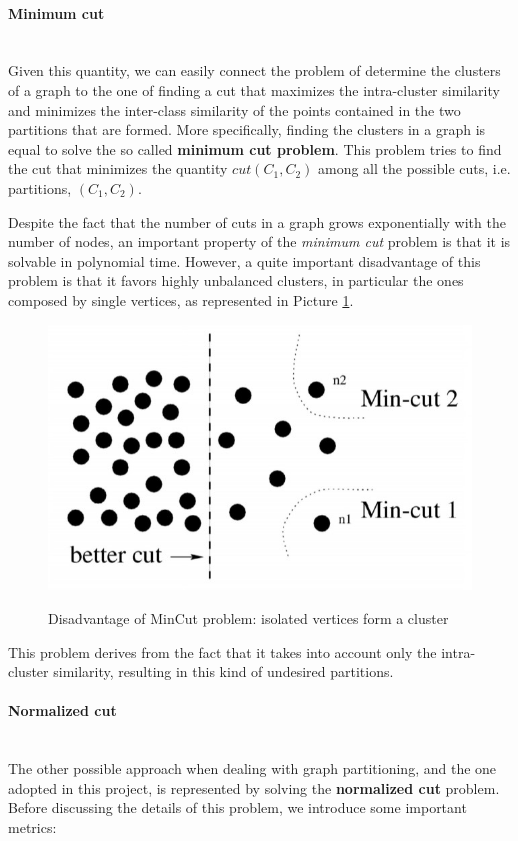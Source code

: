 \paragraph{Minimum cut}
\\
Given this quantity, we can easily connect the problem of determine the clusters of a graph to the one of finding a cut that maximizes the intra-cluster similarity and minimizes the inter-class similarity of the points contained in the two partitions that are formed. More specifically, finding the clusters in a graph is equal to solve the so called \textbf{minimum cut problem}. This problem tries to find the cut that minimizes the quantity $cut(C_1, C_2)$ among all the possible cuts, i.e. partitions, $(C_1, C_2)$.

Despite the fact that the number of cuts in a graph grows exponentially with the number of nodes, an important property of the \textit{minimum cut} problem is that it is solvable in polynomial time. However, a quite important disadvantage of this problem is that it favors highly unbalanced clusters, in particular the ones composed by single vertices, as represented in Picture \ref{problem}.

\begin{figure}[h!]
		\centering
		\includegraphics[scale = 1.0]{img/min cut problem.jpg}
		\label{problem}
		\caption{Disadvantage of MinCut problem: isolated vertices form a cluster}
\end{figure}

This problem derives from the fact that it takes into account only the intra-cluster similarity, resulting in this kind of undesired partitions.

\paragraph{Normalized cut}
\\
The other possible approach when dealing with graph partitioning, and the one adopted in this project, is represented by solving the \textbf{normalized cut} problem. Before discussing the details of this problem, we introduce some important metrics:

